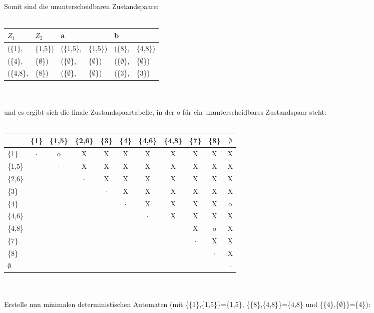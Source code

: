 \documentclass[11pt]{article}
\begin{document}
\\ \ \\
Somit sind die ununterscheidbaren Zustandspaare:
\\ \ \\
\begin{tabular}{ll|ll|ll}
$Z_{1}$&$Z_{2}$&a&&b&\\
\hline
(\{1\}, & \{1,5\}) & (\{1,5\}, & \{1,5\}) & (\{8\}, & \{4,8\})\\
(\{4\}, & \{$\emptyset$\}) & (\{$\emptyset$\}, & \{$\emptyset$\}) & (\{$\emptyset$\}, & \{$\emptyset$\})\\
(\{4,8\}, & \{8\}) & (\{$\emptyset$\}, & \{$\emptyset$\}) & (\{3\}, & \{3\})\\
\end{tabular}
\\ \ \\
und es ergibt sich die finale Zustandspaartabelle, in der o für ein ununterscheidbares Zustandspaar steht: 
\\ \ \\
\begin{tabular}[h]{l|c|c|c|c|c|c|c|c|c|c}
 	&\{1\} &\{1,5\} &\{2,6\} &\{3\} &\{4\} &\{4,6\} &\{4,8\} &\{7\} &\{8\} &$\emptyset$\\
\hline
 \{1\} & $\cdot$ &o&X&X&X&X&X&X&X&X\\
\hline
\{1,5\}& & $\cdot$ &X&X&X&X&X&X&X&X\\
\hline
\{2,6\}& & & $\cdot$ &X&X&X&X&X&X&X\\
\hline
 \{3\} & & & & $\cdot$ &X&X&X&X&X&X\\
\hline
 \{4\} & & & & & $\cdot$ &X&X&X&X&o\\
\hline
\{4,6\}& & & & & & $\cdot$ &X&X&X&X\\
\hline
\{4,8\}& & & & & & & $\cdot$ &X&o&X\\
\hline
 \{7\} & & & & & & & & $\cdot$ &X&X\\
\hline
 \{8\} & & & & & & & & & $\cdot$ &X\\
\hline
$\emptyset$& & & & & & & & & & $\cdot$\\
\end{tabular}
\\ \ \\
Erstelle nun minimalen deterministischen Automaten (mit \{\{1\},\{1,5\}\}=\{1,5\}, \{\{8\},\{4,8\}\}=\{4,8\} und \{\{4\},\{$\emptyset$\}\}=\{4\}):
\\ \ \\
\end{document}
